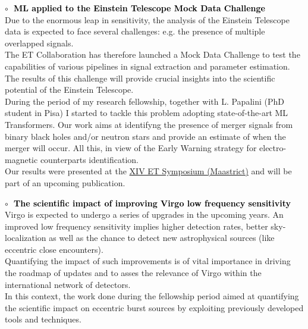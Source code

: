 \textbf{\textcolor{black}{\hspace{0.4cm}$\circ\;$ ML applied to the Einstein Telescope Mock Data Challenge}}\vspace{0.05cm}\\
\indent Due to the enormous leap in sensitivity, the analysis of the Einstein Telescope data is
expected to face several challenges: e.g. the presence of multiple overlapped signals.\\
The ET Collaboration has therefore launched a Mock Data Challenge to test the capabilities of
various pipelines in signal extraction and parameter estimation. The results of this challenge
will provide crucial insights into the scientific potential of the Einstein Telescope.\\
During the period of my research fellowship, together with L. Papalini (PhD student in Pisa) I
started to tackle this problem adopting state-of-the-art ML Transformers. Our work aims at
identifyng the presence of merger signals from binary black holes and/or neutron stars and
provide an estimate of when the merger will occur. All this, in view of the Early Warning
strategy for electro-magnetic counterparts identification.\\
Our results were presented at the \href{https://indico.ego-gw.it/event/710/}{XIV ET Symposium (Maastrict)} and will be 
part of an upcoming publication.

\medskip

\textbf{\textcolor{black}{\hspace{0.4cm}$\circ\;$ The scientific impact of improving Virgo low frequency sensitivity}}\vspace{0.05cm}\\
\indent Virgo is expected to undergo a series of upgrades in the upcoming years. An improved low
frequency sensitivity implies higher detection rates, better sky-localization as well as the
chance to detect new astrophysical sources (like eccentric close encounters).\\
Quantifying the impact of such improvements is of vital importance in driving the roadmap of
updates and to asses the relevance of Virgo within the international network of detectors.\\
In this context, the work done during the fellowship period aimed at quantifying 
the scientific impact on eccentric burst sources by exploiting previously
developed tools and techniques.


